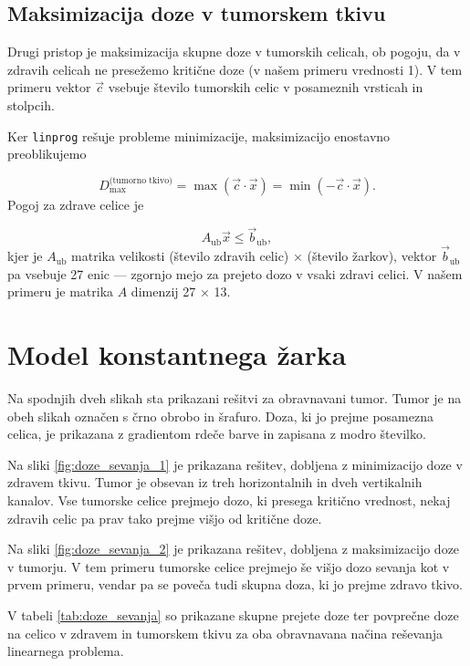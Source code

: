 \documentclass[slovene,11pt,a4paper]{article}
\begin{document}
\subsection{Maksimizacija doze v tumorskem tkivu}

Drugi pristop je maksimizacija skupne doze v tumorskih celicah, ob pogoju, da v zdravih celicah ne presežemo kritične doze (v našem primeru vrednosti 1). V tem primeru vektor $\vec{c}$ vsebuje število tumorskih celic v posameznih vrsticah in stolpcih.

Ker \texttt{linprog} rešuje probleme minimizacije, maksimizacijo enostavno preoblikujemo

\begin{equation}
D_{\text{max}}^{\text{(tumorno tkivo)}} = \max(\vec{c} \cdot \vec{x}) = \min(-\vec{c} \cdot \vec{x}).
\end{equation}
Pogoj za zdrave celice je

\begin{equation}
A_{\text{ub}} \vec{x} \leq \vec{b}_{\text{ub}},
\end{equation}
kjer je $A_{\text{ub}}$ matrika velikosti (število zdravih celic) × (število žarkov), vektor $\vec{b}_{\text{ub}}$ pa vsebuje 27 enic — zgornjo mejo za prejeto dozo v vsaki zdravi celici. V našem primeru je matrika $A$ dimenzij 27 × 13.

\section{Model konstantnega žarka}

Na spodnjih dveh slikah sta prikazani rešitvi za obravnavani tumor. Tumor je na obeh slikah označen s črno obrobo in šrafuro. Doza, ki jo prejme posamezna celica, je prikazana z gradientom rdeče barve in zapisana z modro številko.

Na sliki \ref{fig:doze_sevanja_1} je prikazana rešitev, dobljena z minimizacijo doze v zdravem tkivu. Tumor je obsevan iz treh horizontalnih in dveh vertikalnih kanalov. Vse tumorske celice prejmejo dozo, ki presega kritično vrednost, nekaj zdravih celic pa prav tako prejme višjo od kritične doze.

Na sliki \ref{fig:doze_sevanja_2} je prikazana rešitev, dobljena z maksimizacijo doze v tumorju. V tem primeru tumorske celice prejmejo še višjo dozo sevanja kot v prvem primeru, vendar pa se poveča tudi skupna doza, ki jo prejme zdravo tkivo.

V tabeli \ref{tab:doze_sevanja} so prikazane skupne prejete doze ter povprečne doze na celico v zdravem in tumorskem tkivu za oba obravnavana načina reševanja linearnega problema.
\end{document}

